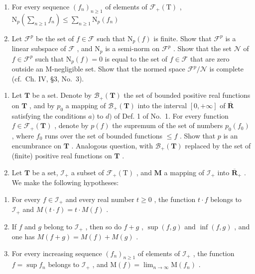 \begin{enumerate}
\def\labelenumi{\alph{enumi})}
\item
  For every sequence \((f_n)_{n\geqslant 1}\) of elements of \(\mathcal{F}_{+}(\mathrm{T})\) , \(\mathrm{N}_p\left(\sum_{n\geqslant 1}f_n\right)\leqslant \sum_{n\geqslant 1}\mathrm{N}_p(f_n)\)
\item
  Let \(\mathcal{F}^p\) be the set of \(f \in \mathcal{F}\) such that \(\mathrm{N}_p(f)\) is finite. Show that \(\mathcal{F}^p\) is a linear subspace of \(\mathcal{F}\) , and \(\mathrm{N}_p\) is a semi-norm on \(\mathcal{F}^p\) . Show that the set \(\mathcal{N}\) of \(f \in \mathcal{F}^p\) such that \(\mathrm{N}_p(f) = 0\) is equal to the set of \(f \in \mathcal{F}\) that are zero outside an M-negligible set. Show that the normed space \(\mathcal{F}^p / \mathcal{N}\) is complete (cf.~Ch. IV, §3, No.~3).
\end{enumerate}

\begin{enumerate}
\def\labelenumi{\arabic{enumi})}
\setcounter{enumi}{4}
\item
  Let \(\mathbf{T}\) be a set. Denote by \(\mathcal{B}_{+}(\mathbf{T})\) the set of bounded positive real functions on \(\mathbf{T}\) , and by \(p_0\) a mapping of \(\mathcal{B}_{+}(\mathbf{T})\) into the interval \([0, +\infty]\) of \(\overline{\mathbf{R}}\) satisfying the conditions \(a)\) to \(d)\) of Def. 1 of No.~1. For every function \(f \in \mathcal{F}_{+}(\mathbf{T})\) , denote by \(p(f)\) the supremum of the set of numbers \(p_0(f_0)\) , where \(f_0\) runs over the set of bounded functions \(\leqslant f\) . Show that \(p\) is an encumbrance on \(\mathbf{T}\) . Analogous question, with \(\mathcal{B}_{+}(\mathbf{T})\) replaced by the set of (finite) positive real functions on \(\mathbf{T}\) .
\item
  Let \(\mathbf{T}\) be a set, \(\mathcal{I}_{+}\) a subset of \(\mathcal{F}_{+}(\mathrm{T})\) , and \(\mathbf{M}\) a mapping of \(\mathcal{I}_{+}\) into \(\overline{\mathbf{R}}_{+}\) . We make the following hypotheses:
\end{enumerate}

\begin{enumerate}
\def\labelenumi{\alph{enumi})}
\item
  For every \(f \in \mathcal{I}_+\) and every real number \(t \geqslant 0\) , the function \(t \cdot f\) belongs to \(\mathcal{I}_+\) and \(M(t \cdot f) = t \cdot M(f)\) .
\item
  If \(f\) and \(g\) belong to \(\mathcal{I}_+\) , then so do \(f + g\) , \(\sup(f, g)\) and \(\inf(f, g)\) , and one has \(M(f + g) = M(f) + M(g)\) .
\item
  For every increasing sequence \((f_n)_{n\geqslant 1}\) of elements of \(\mathcal{I}_+\) , the function \(f = \sup f_n\) belongs to \(\mathcal{I}_+\) , and \(\mathrm{M}(f) = \lim_{n\to \infty}\mathrm{M}(f_n)\) .
\end{enumerate}

